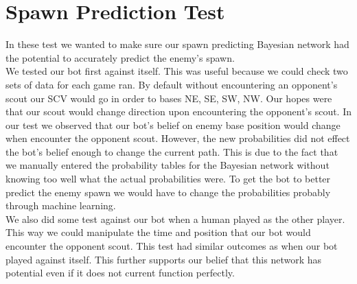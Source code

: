 \section{Spawn Prediction Test}
In these test we wanted to make sure our spawn predicting Bayesian network had the potential to accurately predict the enemy's spawn.\\

We tested our bot first against itself. This was useful because we could check two sets of data for each game ran. By default without encountering an opponent's scout our SCV would go in order to bases NE, SE, SW, NW. Our hopes were that our scout would change direction upon encountering the opponent's scout. In our test we observed that our bot's belief on enemy base position would change when encounter the opponent scout. However, the new probabilities did not effect the bot's belief enough to change the current path. This is due to the fact that we manually entered the probability tables for the Bayesian network without knowing too well what the actual probabilities were. To get the bot to better predict the enemy spawn we would have to change the probabilities probably through machine learning. \\

We also did some test against our bot when a human played as the other player. This way we could manipulate the time and position that our bot would encounter the opponent scout. This test had similar outcomes as when our bot played against itself. This further supports our belief that this network has potential even if it does not current function perfectly.

